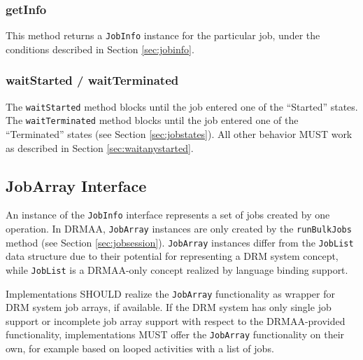 \documentclass{article}
\newcommand{\h}[1]{\lstinline|#1|}
\newcommand{\rat}[1]{}
\begin{document}
\rat{
The getState() function now also returns job subState information. This is intended as additional information for the given DRMAA job state, and can be used for expressing the hold state differentiation from DRMAA 1.0 (conf. call Mar 31st 2009).
}

\subsubsection{getInfo}

This method returns a \h{JobInfo} instance for the particular job, under the conditions described in Section \ref{sec:jobinfo}. 

\subsubsection{waitStarted / waitTerminated}

The \h{waitStarted} method blocks until the job entered one of the \enquote{Started} states. The \h{waitTerminated} method blocks until the job entered one of the \enquote{Terminated} states (see Section \ref{sec:jobstates}). All other behavior MUST work as described in Section \ref{sec:waitanystarted}.

\subsection{JobArray Interface}
\label{sec:jobarray}

 An instance of the \h{JobInfo} interface represents a set of jobs created by one operation. In DRMAA, \h{JobArray} instances are only created by the \h{runBulkJobs} method (see Section \ref{sec:jobsession}). \h{JobArray} instances differ from the \h{JobList} data structure due to their potential for representing a DRM system concept, while \h{JobList} is a DRMAA-only concept realized by language binding support.

Implementations SHOULD realize the \h{JobArray} functionality as wrapper for DRM system job arrays, if available. If the DRM system has only single job support or incomplete job array support with respect to the DRMAA-provided functionality, implementations MUST offer the \h{JobArray} functionality on their own, for example based on looped activities with a list of jobs.



\rat{
We are aware of the fact that some systems (e.g., LSF at the time of writing) do not support all DRMAA control methods offered for job arrays. Since we intended to avoid optional DRMAA methods wherever we could, the text here mandates the implementation to simulate the array support on its own. For example, looping over all jobs in the array and calling \enquote{suspend} for each one is trivial to implement and fulfills the same purpose.
}
\end{document}
